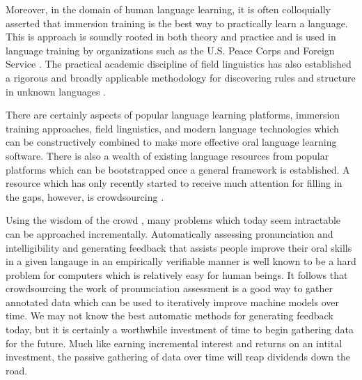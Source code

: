Moreover, in the domain of human language learning, it is often colloquially asserted that immersion training is the best way to practically learn a language. This is approach is soundly rooted in both theory and practice and is used in language training by organizations such as the U.S. Peace Corps and Foreign Service \cite{swain1998interaction} \cite{genesee1987learning} \cite{johnson1997immersion} \cite{howard2005second} \cite{leeds1990notes}. The practical academic discipline of field linguistics has also established a rigorous and broadly applicable methodology for discovering rules and structure in unknown languages \cite{seuren1966grammar} \cite{crowley2007field} \cite{lawler1998using}. 

There are certainly aspects of popular language learning platforms, immersion training approaches, field linguistics, and modern language technologies which can be constructively combined to make more effective oral language learning software. There is also a wealth of existing language resources from popular platforms which can be bootstrapped once a general framework is established. A resource which has only recently started to receive much attention for filling in the gaps, however, is crowdsourcing \cite{eskenazi2013crowdsourcing} \cite{parent2011speaking} \cite{callison2010creating}.

Using the wisdom of the crowd \cite{surowiecki2005wisdom}, many problems which today seem intractable can be approached incrementally. Automatically assessing pronunciation and intelligibility and generating feedback that assists people improve their oral skills in a given langauge in an empirically verifiable manner is well known to be a hard problem for computers which is relatively easy for human beings. It follows that crowdsourcing the work of pronunciation assessment is a good way to gather annotated data which can be used to iteratively improve machine models over time. We may not know the best automatic methods for generating feedback today, but it is certainly a worthwhile investment of time to begin gathering data for the future. Much like earning incremental interest and returns on an intital investment, the passive gathering of data over time will reap dividends down the road.

